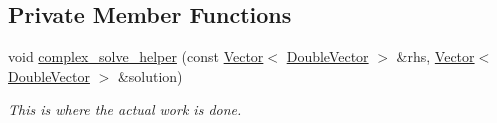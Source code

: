 \subsection*{Private Member Functions}
\begin{DoxyCompactItemize}
\item 
void \hyperlink{classoomph_1_1ComplexDampedJacobi_a09214dc600fe5d261bdb3795aa943aac}{complex\+\_\+solve\+\_\+helper} (const \hyperlink{classoomph_1_1Vector}{Vector}$<$ \hyperlink{classoomph_1_1DoubleVector}{Double\+Vector} $>$ \&rhs, \hyperlink{classoomph_1_1Vector}{Vector}$<$ \hyperlink{classoomph_1_1DoubleVector}{Double\+Vector} $>$ \&solution)
\begin{DoxyCompactList}\small\item\em This is where the actual work is done. \end{DoxyCompactList}\end{DoxyCompactItemize}

